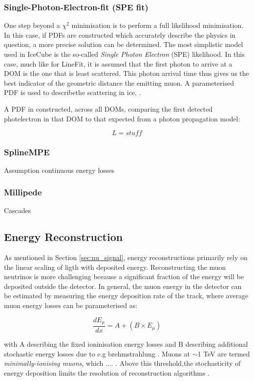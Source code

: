 \subsubsection{Single-Photon-Electron-fit (SPE fit)}

One step beyond a $\chi^{2}$ minimisation is to perform a full likelihood minimisation. In this case, if PDFs are constructed which accurately describe the physics in question, a more precise solution can be determined. The most simplistic model used in IceCube is the so-called \emph{Single Photon Electron} (SPE) likelihood. In this case, much like for LineFit, it is assumed that the first photon to arrive at a DOM is the one that is least scattered. This photon arrival time thus gives us the best indicator of the geometric distance the emitting muon.  A parameterised PDF is used to describethe scattering in ice, \cite{ic_track_14}. 

A PDF in constructed, across all DOMs, comparing the first detected photelectron in that DOM to that expected from a photon propagation model:

\[ L = stuff \]

\subsubsection{SplineMPE}
Assumption continuous energy losses
\subsubsection{Millipede}
Cascades

\subsection{Energy Reconstruction}

As mentioned in Section \ref{sec:nu_signal}, energy reconstructions primarily rely on the linear scaling of ligth with deposited energy. Reconstructing the muon neutrinos is more challenging bceause a significant fraction of the energy will be deposited outside the detector. In general, the muon energy in the detector can be estimated by measuring the energy deposition rate of the track, where average muon energy losses can be parameterised as:

\begin{equation}
	\frac{dE_{\mu}}{dx} = A + \left(B \times E_{\mu} \right)
\end{equation}

with A describing the fixed ioninisation energy losses and B describing additional stochastic energy losses due to e.g brehmstrahlung . Muons at $\sim$1 TeV are termed \emph{minimally-ionising muons}, which .... . Above this threshold,the stochasticity of energy deposition limits the resolution of reconstruction algorithms \cite{ic_energy_reco_14}. 

